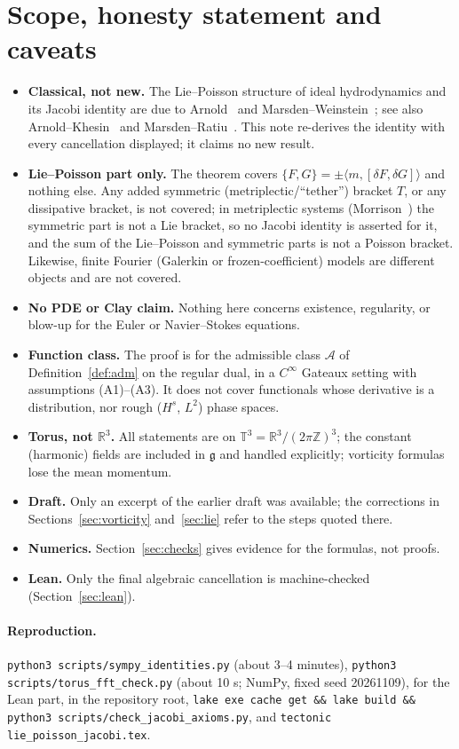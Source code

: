 \documentclass[11pt]{article}
\theoremstyle{definition}
\newcommand{\T}{\mathbb{T}^3}
\newcommand{\R}{\mathbb{R}}
\newcommand{\Z}{\mathbb{Z}}
\newcommand{\g}{\mathfrak{g}}
\newcommand{\ip}[2]{\langle #1,#2\rangle}
\begin{document}
\section{Scope, honesty statement and caveats}
\begin{itemize}
\item \textbf{Classical, not new.} The Lie--Poisson structure of ideal hydrodynamics and its Jacobi identity
are due to Arnold~\cite{arnold1966} and Marsden--Weinstein~\cite{mw1983}; see also
Arnold--Khesin~\cite{ak} and Marsden--Ratiu~\cite{mr}. This note re-derives the identity with every
cancellation displayed; it claims no new result.
\item \textbf{Lie--Poisson part only.} The theorem covers $\{F,G\}=\pm\ip m{[\delta F,\delta G]}$ and nothing
else. Any added symmetric (metriplectic/``tether'') bracket $T$, or any dissipative bracket, is not covered;
in metriplectic systems (Morrison~\cite{morrison1986}) the symmetric part is not a Lie bracket, so no Jacobi
identity is asserted for it, and the sum of the Lie--Poisson and symmetric parts is not a Poisson bracket.
Likewise, finite Fourier (Galerkin or frozen-coefficient) models are different objects and are not covered.
\item \textbf{No PDE or Clay claim.} Nothing here concerns existence, regularity, or blow-up for the Euler or
Navier--Stokes equations.
\item \textbf{Function class.} The proof is for the admissible class $\mathcal A$ of Definition~\ref{def:adm}
on the regular dual, in a $C^\infty$ Gateaux setting with assumptions (A1)--(A3). It does not cover
functionals whose derivative is a distribution, nor rough ($H^s$, $L^2$) phase spaces.
\item \textbf{Torus, not $\R^3$.} All statements are on $\T=\R^3/(2\pi\Z)^3$; the constant (harmonic) fields
are included in $\g$ and handled explicitly; vorticity formulas lose the mean momentum.
\item \textbf{Draft.} Only an excerpt of the earlier draft was available; the corrections in
Sections~\ref{sec:vorticity} and~\ref{sec:lie} refer to the steps quoted there.
\item \textbf{Numerics.} Section~\ref{sec:checks} gives evidence for the formulas, not proofs.
\item \textbf{Lean.} Only the final algebraic cancellation is machine-checked (Section~\ref{sec:lean}).
\end{itemize}

\paragraph{Reproduction.} \texttt{python3 scripts/sympy\_identities.py} (about 3--4 minutes),
\texttt{python3 scripts/torus\_fft\_check.py} (about 10 s; NumPy, fixed seed 20261109),
for the Lean part, in the repository root,
\nolinkurl{lake exe cache get && lake build && python3 scripts/check_jacobi_axioms.py},
and \texttt{tectonic} \texttt{lie\_poisson\_jacobi.tex}.
\end{document}
